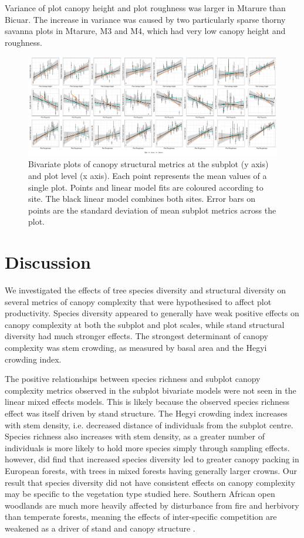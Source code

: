 \documentclass[11pt,a4paper]{article}
\begin{document}
Variance of plot canopy height and plot roughness was larger in Mtarure than Bicuar. The increase in variance was caused by two particularly sparse thorny savanna plots in Mtarure, M3 and M4, which had very low canopy height and roughness.


\begin{figure}[H]
	\includegraphics[width=\textwidth]{plot_subplot_bivar}
	\caption{Bivariate plots of canopy structural metrics at the subplot (y axis) and plot level (x axis). Each point represents the mean values of a single plot. Points and linear model fits are coloured according to site. The black linear model combines both sites. Error bars on points are the standard deviation of mean subplot metrics across the plot.}
	\label{plot_subplot_bivar}
\end{figure}



\section{Discussion}

We investigated the effects of tree species diversity and structural diversity on several metrics of canopy complexity that were hypothesised to affect plot productivity. Species diversity appeared to generally have weak positive effects on canopy complexity at both the subplot and plot scales, while stand structural diversity had much stronger effects. The strongest determinant of canopy complexity was stem crowding, as measured by basal area and the Hegyi crowding index.

The positive relationships between species richness and subplot canopy complexity metrics observed in the subplot bivariate models were not seen in the linear mixed effects models. This is likely because the observed species richness effect was itself driven by stand structure. The Hegyi crowding index increases with stem density, i.e. decreased distance of individuals from the subplot centre. Species richness also increases with stem density, as a greater number of individuals is more likely to hold more species simply through sampling effects. \citet{Jucker2015} however, did find that increased species diversity led to greater canopy packing in European forests, with trees in mixed forests having generally larger crowns. Our result that species diversity did not have consistent effects on canopy complexity may be specific to the vegetation type studied here. Southern African open woodlands are much more heavily affected by disturbance from fire and herbivory than temperate forests, meaning the effects of inter-specific competition are weakened as a driver of stand and canopy structure \citep{}.
\end{document}
